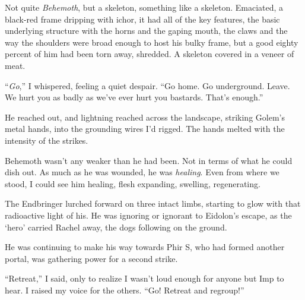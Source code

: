 Not quite \emph{Behemoth}, but a skeleton, something like a skeleton.  Emaciated, a black-red frame dripping with ichor, it had all of the key features, the basic underlying structure with the horns and the gaping mouth, the claws and the way the shoulders were broad enough to host his bulky frame, but a good eighty percent of him had been torn away, shredded.  A skeleton covered in a veneer of meat.



``\emph{Go},'' I whispered, feeling a quiet despair.  ``Go home.  Go underground.  Leave.  We hurt you as badly as we've ever hurt you bastards.  That's enough.''



He reached out, and lightning reached across the landscape, striking Golem's metal hands, into the grounding wires I'd rigged.  The hands melted with the intensity of the strikes.



Behemoth wasn't any weaker than he had been.  Not in terms of what he could dish out. As much as he was wounded, he was \emph{healing}.  Even from where we stood, I could see him healing, flesh expanding, swelling, regenerating.



The Endbringer lurched forward on three intact limbs, starting to glow with that radioactive light of his.  He was ignoring or ignorant to Eidolon's escape, as the `hero' carried Rachel away, the dogs following on the ground.



He was continuing to make his way towards Phir S, who had formed another portal, was gathering power for a second strike.



``Retreat,'' I said, only to realize I wasn't loud enough for anyone but Imp to hear.  I raised my voice for the others.  ``Go!  Retreat and regroup!''





